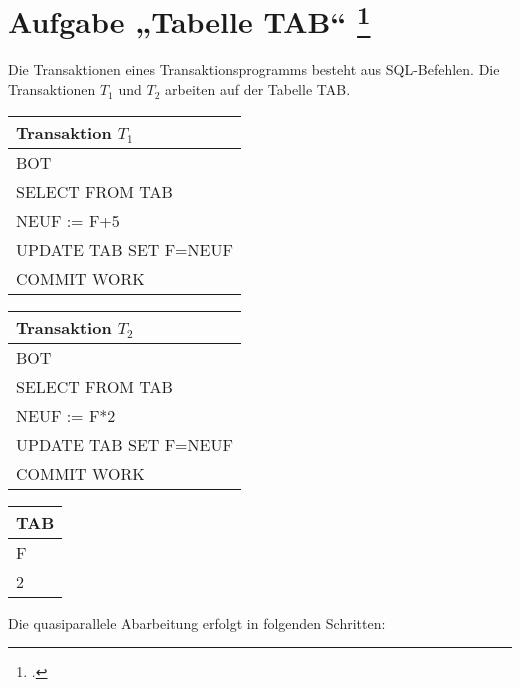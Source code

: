 \documentclass{bschlangaul-aufgabe}
\begin{document}

\section{Aufgabe „Tabelle TAB“
\footcite[Aufgabe 3]{db:ab:6}}

Die Transaktionen eines Transaktionsprogramms besteht aus SQL-Befehlen.
Die Transaktionen $T_1$ und $T_2$ arbeiten auf der Tabelle TAB.

\begin{center}
\begin{tabular}{|l|}
\hline
Transaktion $T_1$     \\\hline\hline
BOT                   \\\hline
SELECT FROM TAB       \\\hline
NEUF := F+5           \\\hline
UPDATE TAB SET F=NEUF \\\hline
COMMIT WORK           \\\hline
\end{tabular}
%
\begin{tabular}{|l|}
\hline
Transaktion $T_2$     \\\hline\hline
BOT                   \\\hline
SELECT FROM TAB       \\\hline
NEUF := F*2           \\\hline
UPDATE TAB SET F=NEUF \\\hline
COMMIT WORK           \\\hline
\end{tabular}
%
\begin{tabular}{|l|}
\hline
TAB \\\hline\hline
F \\\hline
2 \\\hline
\end{tabular}
\end{center}

\noindent
Die quasiparallele Abarbeitung erfolgt in folgenden Schritten:
\end{document}
